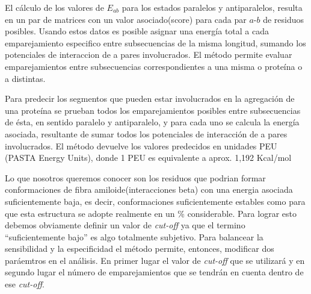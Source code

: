 El cálculo de los valores de $E_{ab}$ para los estados paralelos y antiparalelos, resulta en un par de matrices con un valor asociado(score) para cada par $a$-$b$ de residuos posibles.
Usando estos datos es posible asignar una energía total a cada emparejamiento especifico entre subsecuencias de la misma longitud, sumando los potenciales de interaccion de a pares involucrados. 
El método permite evaluar emparejamientos entre subsecuencias correspondientes a una misma o proteína o a distintas. 

Para predecir los segmentos que pueden estar involucrados en la agregación de una proteína
se prueban todos los emparejamientos posibles entre subsecuencias de ésta, en sentido paralelo y antiparalelo, y para cada uno 
se calcula la energía asociada, resultante de sumar todos los potenciales de interacción de a pares involucrados.
El método devuelve los valores predecidos en unidades PEU (PASTA Energy Units), donde 1 PEU es equivalente a aprox. 1,192 Kcal/mol 

Lo que nosotros queremos conocer son los residuos que podrian formar conformaciones de fibra amiloide(interacciones beta) con una energia asociada
suficientemente baja, es decir, conformaciones suficientemente estables como para que esta estructura se adopte realmente en un \% considerable.
Para lograr esto debemos obviamente definir un valor de \textit{cut-off} ya que el termino ``suficientemente bajo'' es algo totalmente subjetivo. 
Para balancear la sensibilidad y la especificidad el método permite, entonces, modificar dos paráemtros en el análisis. En primer lugar el valor de \textit{cut-off} que se utilizará y en segundo lugar el número de emparejamientos que 
se tendrán en cuenta dentro de ese \textit{cut-off}.

